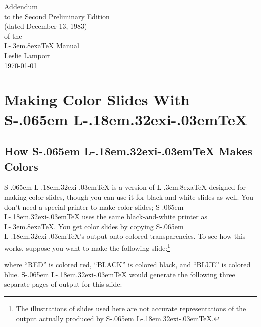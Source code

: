 \setlength{\unitlength}{1pt}


\def\LATEX{L\kern-.3em\raise.8ex\hbox{a}\TeX}
\let\TEX = \TeX
\def\BIBTEX{BIB\kern-.1em\TeX}
\def\SLITEX{S\kern-.065em L\kern-.18em\raise.32ex\hbox{i}\kern-.03em\TEX}


\def\knuth{The \TEX book}





\begin{titlepage}
\vspace*{2in}
\begin{center}
\Large Addendum \\to the
Second Preliminary Edition\\
(dated December 13, 1983)\\
of the\\
\LARGE \LATEX{} Manual\\[.3in]
\large Leslie Lamport\\
\today
\end{center}
\end{titlepage}


\appendix

\setcounter{chapter}{2}
\setcounter{page}{156}

\chapter{Making Color Slides
  With \protect\SLITEX}

\section{How \protect\SLITEX{} Makes Colors}

\SLITEX{}  is a version of \LATEX{} designed for making
color slides, 
though you can use it for black-and-white  slides as well.	You don't need a special printer to make color
slides; \SLITEX{} uses the same black-and-white printer as \LATEX.
You get color slides by copying \SLITEX's output onto colored
transparencies.	 To see how this works, suppose you want to make
the following slide:\footnote{The illustrations of slides used here are not
accurate representations of the output actually produced by
\SLITEX.}
\begin{center}
\end{center}
where ``{\sf RED}'' is colored red, ``{\sf BLACK}'' is colored black,
and ``{\sf BLUE}'' is colored blue.  \SLITEX{} would generate
the following three separate pages of output for this slide:

